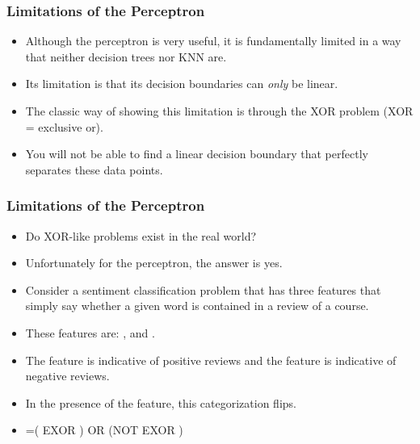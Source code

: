 \documentclass[trans]{beamer}
\begin{document}
\begin{frame}
  \frametitle{Limitations of the Perceptron}
\begin{itemize}
\item 
Although the perceptron is very useful, it is fundamentally limited in
a way that neither decision trees nor KNN are.  
\item Its limitation is that
its decision boundaries can \emph{only} be linear.  
\item The classic way of
showing this limitation is through the XOR problem (XOR = exclusive
or).  
\end{itemize}
\begin{itemize}
\item You will not be able to find a
linear decision boundary that perfectly separates these data points.
\end{itemize}
\end{frame}

\begin{frame}
  \frametitle{Limitations of the Perceptron}
\begin{itemize}
\item 
Do XOR-like problems exist in the real
world? 
\item Unfortunately for the perceptron, the answer is yes.  
\item Consider
a sentiment classification problem that has three features that simply
say whether a given word is contained in a review of a course. 
\item These
features are: ,  and .  
\item The
 feature is indicative of positive reviews and the
 feature is indicative of negative reviews.  
\item In the
presence of the  feature, this categorization flips.
\item {}=( EXOR ) OR (NOT  EXOR )
\end{itemize}
\end{frame}
\end{document}
